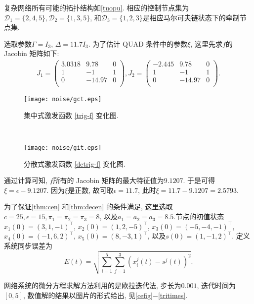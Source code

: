     复杂网络所有可能的拓扑结构如\autoref{tuopu}. 相应的控制节点集为$\mathcal{D}_1=\{2,4,5\}, \mathcal{D}_2=\{1,3,5\}$, 和$\mathcal{D}_3=\{1,2,3\}$是相应马尔可夫链状态下的牵制节点集.

    选取参数$\Gamma=I_3$, $\Delta=11.7I_3$. 为了估计 QUAD 条件中的参数$\xi$, 这里先求$f$的 Jacobin 矩阵如下:
        \begin{align*}
        J_1=\left(
              \begin{array}{ccc}
                3.0318 & 9.78 & 0 \\
                1 & -1 & 1 \\
                0 & -14.97 & 0 \\
              \end{array}
            \right),
        J_2=\left(
              \begin{array}{ccc}
                -2.445 & 9.78 & 0 \\
                1 & -1 & 1 \\
                0 & -14.97 & 0 \\
              \end{array}
            \right).
        \end{align*}
\begin{figure}[!htb]
\begin{minipage}[t]{0.48\linewidth}\centering
\texttt{[image: noise/gct.eps]}\caption{集中式激发函数 \eqref{trig-f} 变化图.}\label{gt}
\end{minipage}~~
\begin{minipage}[t]{0.48\linewidth}\centering
\texttt{[image: noise/git.eps]}\caption{分散式激发函数 \eqref{detrig-f} 变化图.}\label{degt}
\end{minipage}
\end{figure}

        通过计算可知, $f$所有的 Jacobin 矩阵的最大特征值为$9.1207$. 于是可得$\xi=\epsilon-9.1207$. 因为$\xi$是正数, 故可取$\epsilon=11.7$, 此时$\xi=11.7-9.1207=2.5793$.

    为了保证\autoref{thm:cen} 和\autoref{thm:decen} 的条件满足, 这里选取$c=25, \epsilon=15, \pi_1=\pi_2=\pi_3=8$, 以及$a_1=a_2=a_3=8.5$.节点的初值状态$x_1(0)=(3,1,-1)^\top$, $x_2(0)=(1,2,-5)^\top$, $x_3(0)=(-5,-4,-1)^\top$, $x_4(0)=(-1,6, 2)^\top$, $x_5(0)=(8,-3,1)^\top$, 以及$s(0)=(1,-1,2)^\top$.
    定义系统同步误差为
        $$E(t)=\sqrt{\sum_{i=1}^5\sum_{j=1}^3(x_i^j(t)-s^j(t))^2}.$$

    网络系统的微分方程求解方法利用的是欧拉迭代法, 步长为$0.001$, 迭代时间为$[0, 5]$, 数值解的结果以图片的形式给出, 见\autoref{cefig}$-$\autoref{tritimes}.

